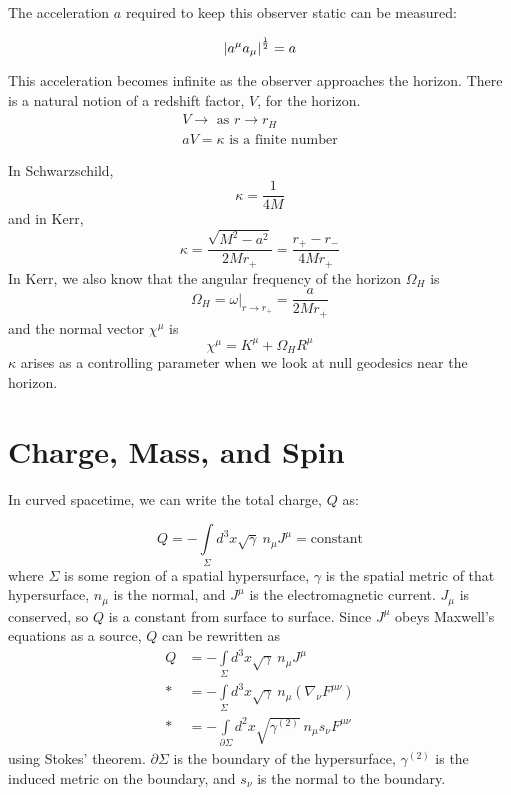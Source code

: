 \documentclass[11pt,table]{article}
\begin{document}
The acceleration $a$ required to keep this observer static can be measured:

\begin{equation}
     \abs{a^\mu a_\mu}^{\frac{1}{2}} = a
\end{equation}

This acceleration becomes infinite as the observer approaches the horizon. There is a natural notion of a redshift factor, $V$, for the horizon.
\begin{align*}
V \xrightarrow{} \text{ as } r \xrightarrow{} r_H \\
aV = \kappa \text{ is a finite number}
\end{align*}

In Schwarzschild, 
\[\kappa = \frac{1}{4M}\]
and in Kerr, 
\[\kappa = \frac{\sqrt{M^2-a^2}}{2Mr_+} = \frac{r_+ - r_-}{4Mr_+}\]
In Kerr, we also know that the angular frequency of the horizon $\Omega_H$ is \\
\[\Omega_H = \omega\Bigr\rvert_{r\xrightarrow{}r_+} = \frac{a}{2Mr_+}\]
and the normal vector $\chi^\mu$ is 
\[\chi^\mu = K^\mu + \Omega_HR^\mu\]
$\kappa$ arises as a controlling parameter when we look at null geodesics near the horizon.

\section{Charge, Mass, and Spin}

In curved spacetime, we can write the total charge, $Q$ as:

\begin{equation}
    Q = -\int\limits_\Sigma d^3x\sqrt{\gamma}\:n_\mu J^\mu = \text{constant}
\end{equation}
where $\Sigma$ is some region of a spatial hypersurface, $\gamma$ is the spatial metric of that hypersurface, $n_\mu$ is the normal, and $J^\mu$ is the electromagnetic current. $J_\mu$ is conserved, so $Q$ is a constant from surface to surface. Since $J^\mu$ obeys Maxwell's equations as a source, $Q$ can be rewritten as
\begin{equation}
    \begin{aligned}
    Q &= -\int\limits_\Sigma d^3x\sqrt{\gamma}\:n_\mu J^\mu \\*
    &= -\int\limits_\Sigma d^3x\sqrt{\gamma}\:n_\mu (\nabla_\nu F^{\mu\nu}) \\*
    &= -\int\limits_{\partial\Sigma} d^2x\sqrt{\gamma^{(2)}}\:n_\mu s_\nu F^{\mu\nu}
     \end{aligned}
\end{equation}
using Stokes' theorem. $\partial\Sigma$ is the boundary of the hypersurface, $\gamma^{(2)}$ is the induced metric on the boundary, and $s_\nu$ is the normal to the boundary. 
\end{document}
